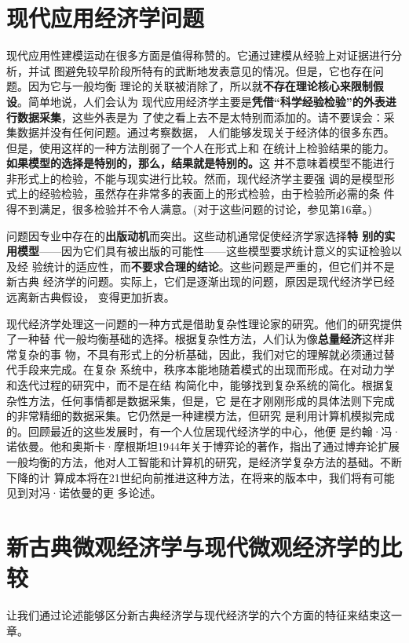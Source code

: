 \section{现代应用经济学问题}

现代应用性建模运动在很多方面是值得称赞的。它通过建模从经验上对证据进行分析，并试
图避免较早阶段所特有的武断地发表意见的情况。但是，它也存在问题。因为它与一般均衡
理论的关联被消除了，所以就\textbf{不存在理论核心来限制假设}。简单地说，人们会认为
现代应用经济学主要是\textbf{凭借“科学经验检验”的外表进行数据采集}，这些外表是为
了使之看上去不是太特别而添加的。请不要误会：采集数据并没有任何问题。通过考察数据，
人们能够发现关于经济体的很多东西。但是，使用这样的一种方法削弱了一个人在形式上和
在统计上检验结果的能力。\textbf{如果模型的选择是特别的，那么，结果就是特别的。}这
并不意味着模型不能进行非形式上的检验，不能与现实进行比较。然而，现代经济学主要强
调的是模型形式上的经验检验，虽然存在非常多的表面上的形式检验，由于检验所必需的条
件得不到满足，很多检验并不令人满意。(对于这些问题的讨论，参见第16章。)

问题因专业中存在的\textbf{出版动机}而突出。这些动机通常促使经济学家选择\textbf{特
  别的实用模型}——因为它们具有被出版的可能性——这些模型要求统计意义的实证检验以及经
验统计的适应性，而\textbf{不要求合理的结论}。这些问题是严重的，但它们并不是新古典
经济学的问题。实际上，它们是逐渐出现的问题，原因是现代经济学已经远离新古典假设，
变得更加折衷。

现代经济学处理这一问题的一种方式是借助复杂性理论家的研究。他们的研究提供了一种替
代一般均衡基础的选择。根据复杂性方法，人们认为像\textbf{总量经济}这样非常复杂的事
物，不具有形式上的分析基础，因此，我们对它的理解就必须通过替代手段来完成。在复杂
系统中，秩序本能地随着模式的出现而形成。在对动力学和迭代过程的研究中，而不是在结
构简化中，能够找到复杂系统的简化。根据复杂性方法，任何事情都是数据采集，但是，它
是在才刚刚形成的具体法则下完成的非常精细的数据采集。它仍然是一种建模方法，但研究
是利用计算机模拟完成的。回顾最近的这些发展时，有一个人位居现代经济学的中心，他便
是约翰·冯·诺依曼。他和奥斯卡·摩根斯坦1944年关于博弈论的著作，指出了通过博弃论扩展
一般均衡的方法，他对人工智能和计算机的研究，是经济学复杂方法的基础。不断下降的计
算成本将在21世纪向前推进这种方法，在将来的版本中，我们将有可能见到对冯·诺依曼的更
多论述。


\section{新古典微观经济学与现代微观经济学的比较}

让我们通过论述能够区分新古典经济学与现代经济学的六个方面的特征来结束这一章。

